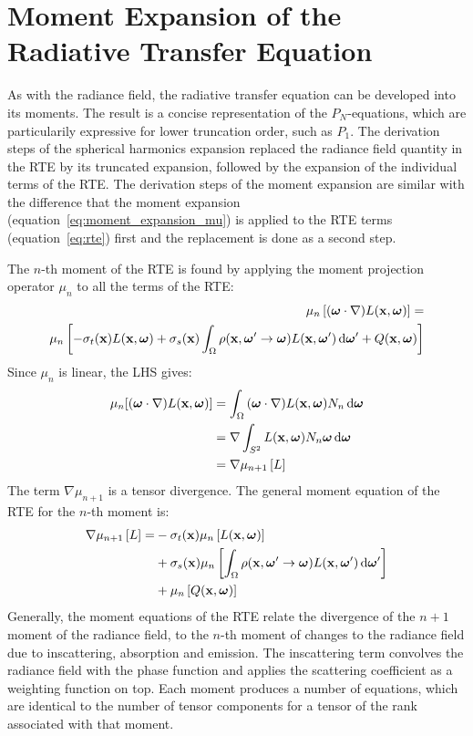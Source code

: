 \section{Moment Expansion of the Radiative Transfer Equation}
\label{sec:da_moment_expansion_RTE}

As with the radiance field, the radiative transfer equation can be developed into its moments. The result is a concise representation of the $P_N$-equations, which are particularily expressive for lower truncation order, such as $P_1$. The derivation steps of the spherical harmonics expansion replaced the radiance field quantity in the RTE by its truncated expansion, followed by the expansion of the individual terms of the RTE. The derivation steps of the moment expansion are similar with the difference that the moment expansion (equation~\ref{eq:moment_expansion_mu}) is applied to the RTE terms (equation~\ref{eq:rte}) first and the replacement is done as a second step.

The $n$-th moment of the RTE is found by applying the moment projection operator $\mu_n$ to all the terms of the RTE:
\begin{align*}
\mu_n\left[(\boldsymbol{\mathbf{\omega}}\cdot\nabla)L(\boldsymbol{\mathbf{x}}, \boldsymbol{\mathbf{\omega}})\right]=&\\
\mu_n\left[-\sigma_t(\boldsymbol{\mathbf{x}})L(\boldsymbol{\mathbf{x}}, \boldsymbol{\mathbf{\omega}}) + \sigma_s(\boldsymbol{\mathbf{x}})\int_{\Omega}\rho(\boldsymbol{\mathbf{x}}, \boldsymbol{\mathbf{\omega}}'\rightarrow\boldsymbol{\mathbf{\omega}})L(\boldsymbol{\mathbf{x}}, \boldsymbol{\mathbf{\omega}}')\,\mathrm{d}\boldsymbol{\mathbf{\omega}}' + Q(\boldsymbol{\mathbf{x}}, \boldsymbol{\mathbf{\omega}})\right]
\end{align*}
Since $\mu_n$ is linear, the LHS gives:
\begin{align*}
\mu_n[(\boldsymbol{\mathbf{\omega}} \cdot \nabla)L(\boldsymbol{\mathbf{x}}, \boldsymbol{\mathbf{\omega}})] & = \int_{\Omega}{(\boldsymbol{\mathbf{\omega}}\cdot\nabla)L(\boldsymbol{\mathbf{x}}, \boldsymbol{\mathbf{\omega}})N_n\,\mathrm{d}\boldsymbol{\mathbf{\omega}}}\\
							     & =\nabla\int_{S^2}{L(\boldsymbol{\mathbf{x}}, \boldsymbol{\mathbf{\omega}})N_n\boldsymbol{\mathbf{\omega}}\,\mathrm{d}\boldsymbol{\mathbf{\omega}}} \\
							     & =\nabla\mu_{n+1}\left[L\right]
\end{align*}
The term $\nabla\mu_{n+1}$ is a tensor divergence. The general moment equation of the RTE for the $n$-th moment is:
\begin{align}
\nonumber
\nabla\mu_{n+1}\left[L\right] =&
-\sigma_t(\boldsymbol{\mathbf{x}})\mu_n\left[L(\boldsymbol{\mathbf{x}}, \boldsymbol{\mathbf{\omega}})\right]\\
\label{eq:gme}
&+\sigma_s(\boldsymbol{\mathbf{x}})\mu_n\left[\int_{\Omega}\rho(\boldsymbol{\mathbf{x}}, \boldsymbol{\mathbf{\omega}}'\rightarrow\boldsymbol{\mathbf{\omega}}) L(\boldsymbol{\mathbf{x}}, \boldsymbol{\mathbf{\omega}}')\,\mathrm{d}\boldsymbol{\mathbf{\omega}}'\right]\\
\nonumber
&+\mu_n\left[Q(\boldsymbol{\mathbf{x}}, \boldsymbol{\mathbf{\omega}})\right]
\end{align}
Generally, the moment equations of the RTE relate the divergence of the $n+1$ moment of the radiance field, to the $n$-th moment of changes to the radiance field due to inscattering, absorption and emission. The inscattering term convolves the radiance field with the phase function and applies the scattering coefficient as a weighting function on top. Each moment produces a number of equations, which are identical to the number of tensor components for a tensor of the rank associated with that moment.

